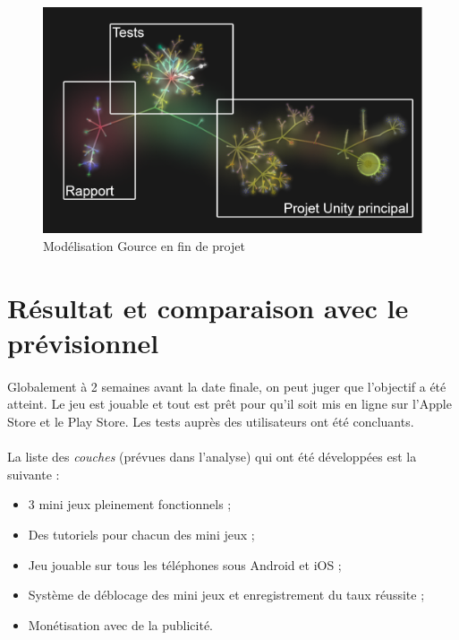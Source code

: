\begin{figure}[H]\centering
  \includegraphics[scale=.3]{./img/gource_over.png}
  \caption{Modélisation Gource en fin de projet}
  \label{gource_over}
\end{figure}

\section{Résultat et comparaison avec le prévisionnel}

\paragraph{}
Globalement à 2 semaines avant la date finale, on peut juger que l'objectif a été atteint. 
Le jeu est jouable et tout est prêt pour qu'il soit mis en ligne sur l'Apple Store et le Play Store. Les tests auprès des utilisateurs ont été concluants.

\paragraph{}
La liste des \textit{couches} (prévues dans l'analyse) qui ont été développées est la suivante :
\begin{itemize}
\item 3 mini jeux pleinement fonctionnels ;
\item Des tutoriels pour chacun des mini jeux ;
\item Jeu jouable sur tous les téléphones sous Android et iOS ;
\item Système de déblocage des mini jeux et enregistrement du taux réussite ;
\item Monétisation avec de la publicité.
\end{itemize}

